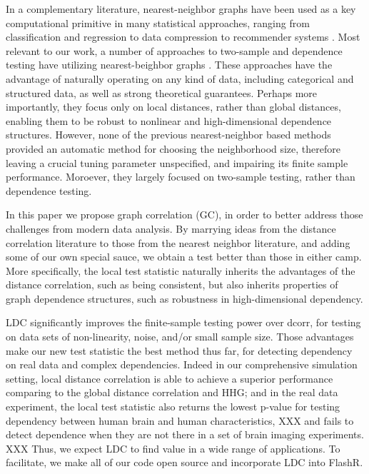\documentclass[12pt]{article}
\begin{document}
In a complementary literature, nearest-neighbor graphs have been used as a key computational primitive in many statistical approaches, ranging from classification and regression \cite{Stone1970} to data compression to recommender systems \cite{Sarwar2000}. Most relevant to our work, a number of approaches to two-sample and dependence testing have utilizing nearest-beighbor graphs \cite{David1966,Friedman1983,Schilling1986,Dumcke2014}.  These approaches have the advantage of naturally operating on any kind of data, including categorical and structured data, as well as strong theoretical guarantees.  Perhaps more importantly, they focus only on local distances, rather than global distances, enabling them to be robust to nonlinear and high-dimensional dependence structures.  However, none of the previous nearest-neighbor based methods provided an automatic method for choosing the neighborhood size, therefore leaving a crucial tuning parameter unspecified, and impairing its finite sample performance. Moroever, they largely focused on two-sample testing, rather than dependence testing.  


In this paper we propose graph correlation (GC), in order to better address those challenges from modern data analysis. By marrying ideas from the distance correlation literature to those from the nearest neighbor literature, and adding some of our own special sauce, we obtain a test better than those in either camp.  More specifically,  the local test statistic naturally inherits the advantages of the  distance correlation, such as being consistent, but also inherits properties of graph dependence structures, such as robustness in high-dimensional dependency.  

LDC significantly improves the finite-sample testing power over dcorr, for testing on data sets of non-linearity, noise, and/or small sample size. Those advantages make our new test statistic the best method thus far, for detecting dependency on real data and complex dependencies. Indeed in our comprehensive simulation setting, local distance correlation is able to achieve a superior performance comparing to the global distance correlation and HHG; and in the real data experiment, the local test statistic also returns the lowest p-value for testing dependency between human brain and human characteristics, XXX and fails to detect dependence when they are not there in a set of brain imaging experiments. XXX  Thus, we expect LDC to find value in a wide range of applications.  To facilitate, we make all of our code open source and incorporate LDC into FlashR.
\end{document}
